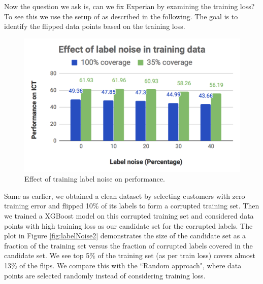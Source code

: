 Now the question we ask is, can we fix Experian by examining the training loss? To see this we use the setup of \cite{pmlr-v70-koh17a} as described in the following. The goal is to identify the flipped data points based on the training loss. 
 \begin{figure}
\captionsetup{font=small}
\setlength{\belowcaptionskip}{-10pt}
  \centering
  \includegraphics[width=0.92\linewidth]{Plots/labelNoise1.png}
  \caption{Effect of training label noise on performance.}
  \label{fig:labelNoise1}
\end{figure}
Same as earlier, we obtained a clean dataset by selecting customers with zero training error and flipped 10\% of its labels to form a corrupted training set. Then we trained a XGBoost model on this corrupted training set and considered data points with high training loss as our candidate set for the corrupted labels. 
%
The plot in Figure \ref{fig:labelNoise2} demonstrates the size of the candidate set as a fraction of the training set versus the fraction of corrupted labels covered in the candidate set. We see top 5\% of the training set (as per train loss) covers almost 13\% of the flips. We compare this with the ``Random approach", where data points are selected randomly instead of considering training loss. 
